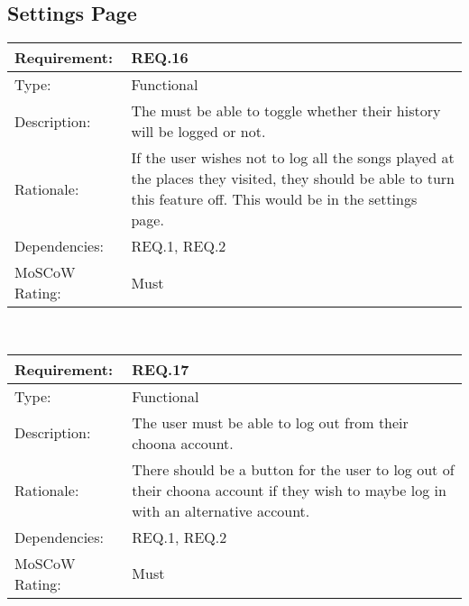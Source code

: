 \vspace{0.5cm}
\subsection*{Settings Page}

\noindent
\begin{tabular}{|l || p{12.0cm}|}
  \hline
  Requirement:       & REQ.16 \\ \hline
  Type:              & Functional \\ \hline
  Description:       & The must be able to toggle whether their history will be logged or not.   \\ \hline
  Rationale:         & If the user wishes not to log all the songs played at the places they visited, they should be able to turn this feature off. This would be in the settings page. \\ \hline
  Dependencies:      & REQ.1, REQ.2 \\ \hline
  MoSCoW Rating:     & Must \\ \hline
\end{tabular}\\

\vspace{0.5cm}

\noindent
\begin{tabular}{|l || p{12.0cm}|}
  \hline
  Requirement:       & REQ.17 \\ \hline
  Type:              & Functional \\ \hline
  Description:       & The user must be able to log out from their choona account.   \\ \hline
  Rationale:         & There should be a button for the user to log out of their choona account if they wish to maybe log in with an alternative account.  \\ \hline
  Dependencies:      & REQ.1, REQ.2 \\ \hline
  MoSCoW Rating:     & Must \\ \hline
\end{tabular}\\
